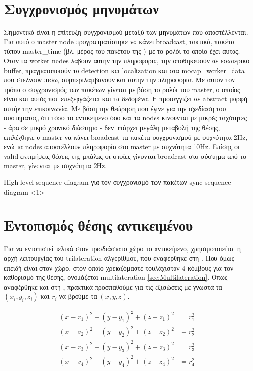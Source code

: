 \section{Συγχρονισμός μηνυμάτων}
Σημαντικό είναι η επίτευξη συγχρονισμού μεταξύ των μηνυμάτων που α\-πο\-στέ\-λλο\-νται. Για αυτό ο master node προγραμματίστηκε να κάνει broadcast, τακτικά, πακέτα τύπου master\_time (βλ. μέρος του πακέτου της ) με το ρολόι το οποίο έχει αυτός. Όταν τα worker nodes λάβουν αυτήν την πληροφορία, την αποθηκεύουν σε εσωτερικό buffer, πραγματοποιούν το detection και localization και στα mocap\_worker\_data που στέλνουν πίσω, συμπεριλαμβάνουν και αυτήν την πληροφορία. Με αυτόν τον τρόπο ο συγχρονισμός των πακέτων γίνεται με βάση το ρολόι του master, ο οποίος είναι και αυτός που επεξεργάζεται και τα δεδομένα. Η  προσεγγίζει σε abstract μορφή αυτήν την επικοινωνία. Με βάση την θεώρηση που έγινε για την σχεδίαση του συστήματος, ότι τόσο το αντικείμενο όσο και τα nodes κινούνται με μικρές ταχύτητες - άρα σε μικρό χρονικό διάστημα - δεν υπάρχει μεγάλη μεταβολή της θέσης, επιλέχθηκε ο master να κάνει broadcast τα πακέτα συγχρονισμού με συχνότητα 2Hz, ενώ τα nodes αποστέλλουν πληροφορία στο master με συχνότητα 10Hz. Επίσης οι valid εκτιμήσεις θέσεις της μπάλας οι οποίες γίνονται broadcast στο σύστημα από το master, γίνονται με συχνότητα 2Hz.  

{High level sequence diagram για τον συγχρονισμό των πακέτων} %
{sync-sequence-diagram} %
<1>


\section{Εντοπισμός θέσης αντικειμένου}\label{sec:implementation-obj-mult}
Για να εντοπιστεί τελικά στον τρισδιάστατο χώρο το αντικείμενο, χρησιμοποιείται η αρχή λειτουργίας του trilateration αλγορίθμου, που αναφέρθηκε στη . Που όμως επειδή είναι στον  χώρο, στον οποίο χρειαζόμαστε τουλάχιστον 4 κόμβους για τον καθορισμό της θέσης, ονομάζεται multilateration \ref{sec:Multilateration}. Όπως αναφέρθηκε και στη , πρακτικά προσπαθούμε για τις εξισώσεις  με γνωστά τα $(x_i, y_i, z_i)$ και $r_i$ να βρούμε τα $(x,y,z)$. 
 
\begin{align}
	(x-x_1)^2 + (y-y_1)^2 + (z-z_1)^2 &= r_1^2 \label{eq:multilateration-pha1} \\ 
	(x-x_2)^2 + (y-y_2)^2 + (z-z_2)^2 &= r_2^2 \nonumber \\
	(x-x_3)^2 + (y-y_3)^2 + (z-z_3)^2 &= r_3^2 \nonumber \\
	(x-x_4)^2 + (y-y_4)^2 + (z-z_4)^2 &= r_4^2 \nonumber 
\end{align}

